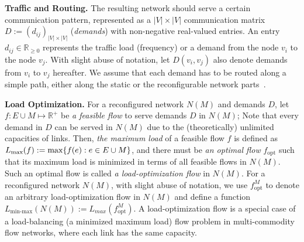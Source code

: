 \documentclass[sigconf]{acmart}
\newcommand\klaus[1]{\color{olive}\textbf{Klaus: #1}\color{black}}
\begin{document}
\noindent\textbf{Traffic and Routing.} 
The resulting network should serve a certain 
communication pattern, represented as a $|V| \times |V|$ 
communication matrix $D:=\left( d_{ij}\right)_{|V| \times |V|} $
(\emph{demands}) with non-negative real-valued entries. 
An entry $d_{ij}\in \mathbb{R}_{\geq 0}$ represents the traffic load (frequency) or a demand
from the node $v_i$ to the node $v_j$. With slight abuse of notation,  let $D(v_i,v_j)$ also denote demands from $v_i$ to $v_j$ hereafter.
We assume that each demand has to be routed along a simple path, either along the static or the reconfigurable network parts~\cite{helios,cthrough}.



\noindent\textbf{Load Optimization.} 
%
For a reconfigured network $N(M)$ and demands $D$, let  $f:E\cup M\mapsto \mathbb{R}^+$ be \emph{a feasible flow} to serve demands $D$ in $N(M)$;
%
Note that every demand in $D$ can be served in $N(M)$ due to the (theoretically) unlimited capacities of links. 
%
Then, \emph{the maximum load} of a feasible flow $f$ is defined as ${L_\textnormal{max}(f)}:=\max\{f(e): e\in E\cup M\}$, and there must be \emph{an optimal flow} $f_{\text{opt}}$ such that its maximum load is minimized in terms of all feasible flows in $N(M)$.
%
Such an optimal flow  is called \emph{a load-optimization flow} in $N(M)$.
%
For a reconfigured network $N(M)$, with slight abuse of notation, we use $f^{M}_{\text{opt}}$ to denote an arbitrary load-optimization flow in $N(M)$  and define a function $L_{\text{min-max}}\left(N(M) \right):=L_{max}\left(f^{M}_{\text{opt}}\right)$.
%
A load-optimization flow is a special case of a load-balancing (a minimized maximum load) flow problem in multi-commodity flow networks, where each link has the same capacity.
%
\end{document}
